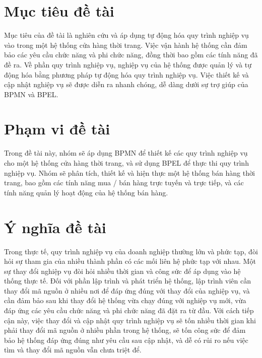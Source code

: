 \section{Mục tiêu đề tài}
\hspace{0.5cm}Mục tiêu của đề tài là nghiên cứu và áp dụng tự động hóa quy trình nghiệp vụ vào trong một hệ thống cửa hàng thời trang. Việc vận hành hệ thống cần đảm bảo các yêu cầu chức năng và phi chức năng, đồng thời bao gồm các tính năng đã đề ra. Về phần quy trình nghiệp vụ, nghiệp vụ của hệ thống được quản lý và tự động hóa bằng phương pháp tự động hóa quy trình nghiệp vụ. Việc thiết kế và cập nhật nghiệp vụ sẽ được diễn ra nhanh chóng, dễ dàng dưới sự trợ giúp của BPMN và BPEL.

\section{Phạm vi đề tài}
\hspace{0.5cm}Trong đề tài này, nhóm sẽ áp dụng BPMN để thiết kế các quy trình nghiệp vụ cho một hệ thống cửa hàng thời trang, và sử dụng BPEL để thực thi quy trình nghiệp vụ. Nhóm sẽ phân tích, thiết kế và hiện thực một hệ thống bán hàng thời trang, bao gồm các tính năng mua / bán hàng trực tuyến và trực tiếp, và các tính năng quản lý hoạt động của hệ thống bán hàng.

\section{Ý nghĩa đề tài}
\hspace{0.5cm} Trong thực tế, quy trình nghiệp vụ của doanh nghiệp thường lớn và phức tạp, đòi hỏi sự tham gia của nhiều thành phần có các mối liên hệ phức tạp với nhau. Một sự thay đổi nghiệp vụ đòi hỏi nhiều thời gian và công sức để áp dụng vào hệ thống thực tế. Đối với phần lập trình và phát triển hệ thống, lập trình viên cần thay đổi mã nguồn ở nhiều nơi để đáp ứng đúng với thay đổi của nghiệp vụ, và cần đảm bảo sau khi thay đổi hệ thống vừa chạy đúng với nghiệp vụ mới, vừa đáp ứng các yêu cầu chức năng và phi chức năng đã đặt ra từ đầu. Với cách tiếp cận này, việc thay đổi và cập nhật quy trình nghiệp vụ sẽ tốn nhiều thời gian khi phải thay đổi mã nguồn ở nhiều phần trong hệ thống, sẽ tốn công sức để đảm bảo hệ thống đáp ứng đúng như yêu cầu sau cập nhật, và dễ có rủi ro nếu việc tìm và thay đổi mã nguồn vẫn chưa triệt để.\\

